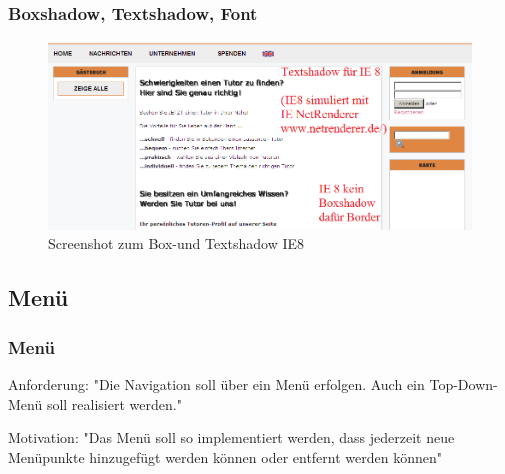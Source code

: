 \begin{frame}

\frametitle{Boxshadow, Textshadow, Font}
\begin{figure}[!htbp]
 \centering
\includegraphics[width=0.9\linewidth]{./Source/IE8textshadow.PNG}
 \caption{Screenshot zum Box-und Textshadow IE8}

\end{figure}

\end{frame}



\subsection{Menü}

\begin{frame} %
  \frametitle{Menü} %


  \begin{block}{Anforderung:}
	"Die Navigation soll über ein Menü erfolgen. Auch ein Top-Down-Menü soll realisiert werden."
  \end{block}

  \begin{block}{Motivation:}
	"Das Menü soll so implementiert werden, dass jederzeit neue Menüpunkte hinzugefügt werden können oder entfernt werden können"
  \end{block}
\end{frame}


